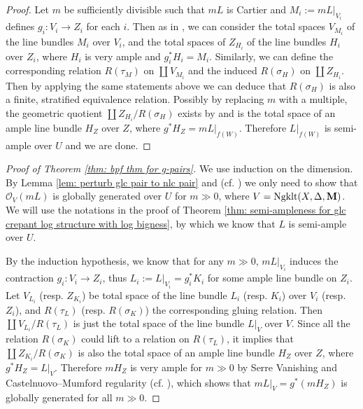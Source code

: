 \documentclass[11pt]{amsart}
\numberwithin{equation}{section}
\newcommand{\Mm}{{\bf{M}}}
\newcommand{\Qq}{\mathbb{Q}}
\newcommand{\Ngklt}{\operatorname{Ngklt}}
\newcommand{\Oo}{\mathcal{O}}
\newtheorem{cor}[thm]{Corollary}
\theoremstyle{definition}
\theoremstyle{definition}
\theoremstyle{definition}
\begin{document}
\begin{proof}
Let $m$ be sufficiently divisible such that $mL$ is Cartier and $M_i:=mL|_{V_i}$ defines $g_i:V_i\to Z_i$ for each $i$. Then as in \cite[Construction 4.13]{LX22b}, we can consider the total spaces $V_{M_i}$ of the line bundles $M_i$ over $V_i$, and the total spaces of $Z_{H_i}$ of the line bundles $H_i$ over $Z_i$, where $H_i$ is very ample and $g^*_iH_i=M_i$. Similarly, we can define the corresponding relation $R(\tau_M)$ on $\coprod V_{M_i}$ and the induced $R(\sigma_H)$ on $\coprod Z_{H_i}$. Then by applying the same statements above we can deduce that $R(\sigma_H)$ is also a finite, stratified equivalence relation. Possibly by replacing $m$ with a multiple, the geometric quotient $\coprod Z_{H_i}/R(\sigma_H)$ exists by \cite[Theorem 9.21]{Kol13} and is the total space of an ample line bundle $H_Z$ over $Z$, where $g^*H_Z=mL|_{f(W)}$. Therefore $L|_{f(W)}$ is semi-ample over $U$ and we are done.
\end{proof}

\begin{proof}[Proof of Theorem \ref{thm: bpf thm for g-pairs}]
We use induction on the dimension.
By Lemma \ref{lem: perturb glc pair to nlc pair} and \cite[Theorem 13.1]{Fuj11} (cf. \cite[Theorem 7.2]{Amb03}) we only need to show that $\Oo_V(mL)$ is globally generated over $U$ for $m\gg0$, where $V=\Ngklt(X,\Delta,\Mm)$. We will use the notations in the proof of Theorem \ref{thm: semi-ampleness for glc crepant log structure with log bigness}, by which we know that $L$ is semi-ample over $U$. 

By the induction hypothesis, we know that for any $m\gg0$, $mL|_{V_i}$ induces the contraction $g_i:V_i\to Z_i$, thus $L_i:=L|_{V_i}=g_i^*K_i$ for some ample line bundle on $Z_i$. Let $V_{L_i}$ (resp. $Z_{K_i}$) be total space of the line bundle $L_i$ (resp. $K_i$) over $V_i$ (resp. $Z_i$), and $R(\tau_L)$ (resp. $R(\sigma_K)$) the corresponding gluing relation. Then $\coprod V_{L_i}/R(\tau_L)$ is just the total space of the line bundle $L|_{V}$ over $V$. Since all the relation $R(\sigma_K)$ could lift to a relation on $R(\tau_L)$, it implies that $\coprod Z_{K_i}/R(\sigma_K)$ is also the total space of an ample line bundle $H_Z$ over $Z$, where $g^*H_Z=L|_V$. Therefore $mH_Z$ is very ample for $m\gg0$ by Serre Vanishing and Castelnuovo–Mumford regularity (cf. \cite[1.8.22]{Laz04}), which shows that $mL|_V=g^*(mH_Z)$ is globally generated for all $m\gg0$. 
\end{proof}
\end{document}
